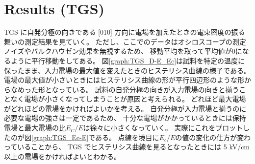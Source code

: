 \documentclass[11pt,dvipdfmx,a4paper]{jsarticle}
\begin{document}
\section{Results (TGS)}
TGS に自発分極の向きである [010] 方向に電場を加えたときの電束密度の振る舞いの測定結果を見ていく。
ただし、ここでのデータはオシロスコープの測定ノイズやバルクハウゼン効果を無視するため、
移動平均を取って平均値が0になるように平行移動をしてある。
図\ref{graph:TGS_D-E_Ec}は試料を特定の温度に保ったまま、入力電場の最大値を変えたときのヒステリシス曲線の様子である。
電場の最大値が小さいときにはヒステリシス曲線の形が平行四辺形のような形からなめった形となっている。
試料の自発分極の向きが入力電場の向きと揃うことなく電場が小さくなってしまうことが原因と考えられる。
どれほど最大電場がどれほどの電場をかければよいかを考える。
自発分極が入力電場と揃うのに必要な電場の強さは一定であるため、
十分な電場がかかっているときには保持電場と最大電場の比\(E_C/E\)は徐々に小さくなっていく。
実際にこれをプロットしたのが図\ref{graph:TGS_Ec-E}である。
点線を境目に\(E_c/E\)の値の変化の仕方が変わっていることから、
TGS でヒステリシス曲線を見るとなったときには 5 kV/cm 以上の電場をかければよいとわかる。
\end{document}
